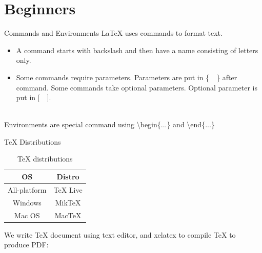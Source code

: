 \documentclass[10pt]{beamer}
\begin{document}
\section{Beginners}
\begin{frame}{\TeX{} Source File}
TeX},
    morekeywords={maketitle},keywordstyle=\color{red}]{einstein.tex}
\end{frame}

\begin{frame}{Commands and Environments}
    \LaTeX{} uses commands to format text.
\begin{itemize}
    \item A command starts with backslash and then have a name
        consisting of letters only.
    \item Some commands require parameters. Parameters are put in 
        \{\ \ \} after command. Some commands take optional parameters.
        Optional parameter is put in [\ \ ].
       \ \\ \ \\

\end{itemize}

    Environments are special command using \textbackslash begin\{...\}
    and \textbackslash end\{...\}

\end{frame}

\begin{frame}{\TeX{} Distributions}
\begin{table}
\centering
    \caption{\TeX{} distributions}
    \begin{tabular}{cc}\hline\hline
        OS          &   Distro\\\hline
        All-platform & TeX Live\\
        Windows    & MikTeX \\
        Mac OS    & MacTeX\\\hline
    \end{tabular}
\end{table}

    We write \TeX{} document using text editor, and xelatex to compile
    \TeX{} to produce PDF:
   \\ ~ \\

\centering

\end{frame}
\end{document}
